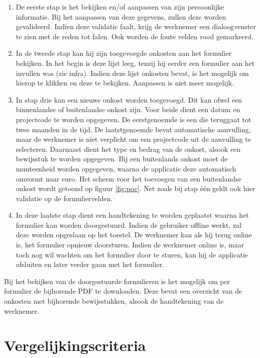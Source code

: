 \begin{enumerate}
\item De eerste stap is het bekijken en/of aanpassen van zijn persoonlijke informatie.
Bij het aanpassen van deze gegevens, zullen deze worden gevalideerd.
Indien deze validatie faalt, krijg de werknemer een dialoogvenster te zien met de reden tot falen.
Ook worden de foute velden rood gemarkeerd.


\item In de tweede stap kan hij zijn toegevoegde onkosten aan het formulier bekijken.
In het begin is deze lijst leeg, tenzij hij eerder een formulier aan het invullen was (zie infra).
Indien deze lijst onkosten bevat, is het mogelijk om hierop te klikken en deze te bekijken. Aanpassen is niet meer mogelijk.

\item In stap drie kan een nieuwe onkost worden toegevoegd.
Dit kan ofwel een binnenlandse of buitenlandse onkost zijn.
Voor beide dient een datum en projectcode te worden opgegeven.
De eerstgenoemde is een  die teruggaat tot twee maanden in de tijd.
De laatstgenoemde bevat automatische aanvulling, maar de werknemer is niet verplicht om een projectcode uit de aanvulling te selecteren.
Daarnaast dient het type en bedrag van de onkost, alsook een bewijsstuk te worden opgegeven.
Bij een buitenlands onkost moet de munteenheid worden opgegeven, waarna de applicatie deze automatisch omvormt naar euro.
Het scherm voor het toevoegen van een buitenlandse onkost wordt getoond op figuur \ref{fig:poc}. 
Net zoals bij stap één geldt ook hier validatie op de formuliervelden.

\item In deze laatste stap dient een handtekening te worden geplaatst waarna het formulier kan worden doorgestuurd.
Indien de gebruiker offline werkt, zal deze worden opgeslaan op het toestel.
De werknemer kan als hij terug online is, het formulier opnieuw doorsturen.
Indien de werknemer online is, maar toch nog wil wachten om het formulier door te sturen, kan hij de applicatie afsluiten en later verder gaan met het formulier.

\end{enumerate}

Bij het bekijken van de doorgestuurde formulieren is het mogelijk om per formulier de bijhorende PDF te downloaden. 
Deze bevat een overzicht van de onkosten met bijhorende bewijsstukken, alsook de handtekening van de werknemer.

\section{Vergelijkingscriteria} %
\label{sec:vergelijking-criteria}

